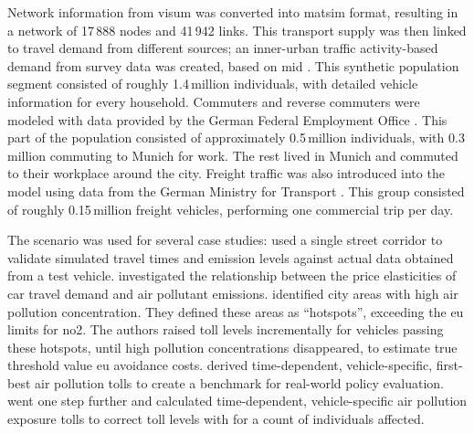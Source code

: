 Network information from \acrshort{visum} was converted into \gls{matsim} format, resulting in a network of 17\,888 nodes and 41\,942 links.
%
This transport supply was then linked to travel demand from different sources; an inner-urban traffic activity-based demand from survey data was created, based on \gls{mid} \citep[MiD 2002,][]{FollmerEtAl_TechRep_infasDIW_2004}. This synthetic population segment consisted of roughly 1.4\,million individuals, with detailed vehicle information for every household.
%
Commuters and reverse commuters were modeled with data provided by the German Federal Employment Office \citep{BoehmeEigenhueller_TechRep_IAB_2006}. This part of the population consisted of approximately 0.5\,million individuals, with 0.3\,million commuting to Munich for work. The rest lived in Munich and commuted to their workplace around the city.
%
Freight traffic was also introduced into the model using data from the German Ministry for Transport \citep{ITBBVU_TechRep_2007}. This group consisted of roughly 0.15\,million freight vehicles, performing one commercial trip per day.

The scenario was used for several case studies:
%
\citet{HuelsmannEtAl_LAS_2011} used a single street corridor to validate simulated travel times and emission levels against actual data obtained from a test vehicle.
%
\citet{KickhoeferEtAl_VanoutriveVerhetsel_2013} investigated the relationship between the price elasticities of car travel demand and air pollutant emissions.
%
\citet{HuelsmannEtAl_GerikeEtAl_2013} identified city areas with high air pollution concentration. They defined these areas as ``hotspots'', exceeding the \gls{eu} limits for \gls{no2}. The authors raised toll levels incrementally for vehicles passing these hotspots, until high pollution concentrations disappeared, to estimate true threshold value \gls{eu} avoidance costs.
%
\citet{KickhoeferNagel2013EmissionInternalizationNETS} derived time-dependent, vehicle-specific, first-best air pollution tolls to create a benchmark for real-world policy evaluation.
%
\citet{KickhoeferKern2015ExposurePricingTRD} went one step further and calculated time-dependent, vehicle-specific air pollution exposure tolls to correct toll levels with \citet{KickhoeferNagel2013EmissionInternalizationNETS} for a count of individuals affected.



